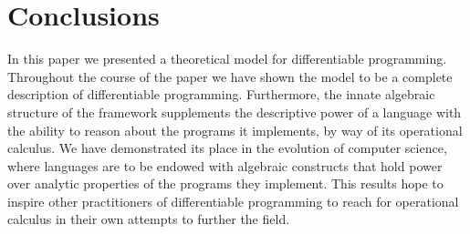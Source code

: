 \section{Conclusions}

In this paper we presented a theoretical model for differentiable programming. Throughout the course of the paper we have shown the model to be a complete description of differentiable programming.
Furthermore, the innate algebraic structure of the framework supplements the descriptive power of a language with the ability to reason about the programs it implements, by way of its operational calculus. We have demonstrated its place in the evolution of computer science, where languages are to be endowed with algebraic constructs that hold power over analytic properties of the programs they implement. This results hope to inspire other practitioners of differentiable programming to reach for operational calculus in their own attempts to further the field. 
